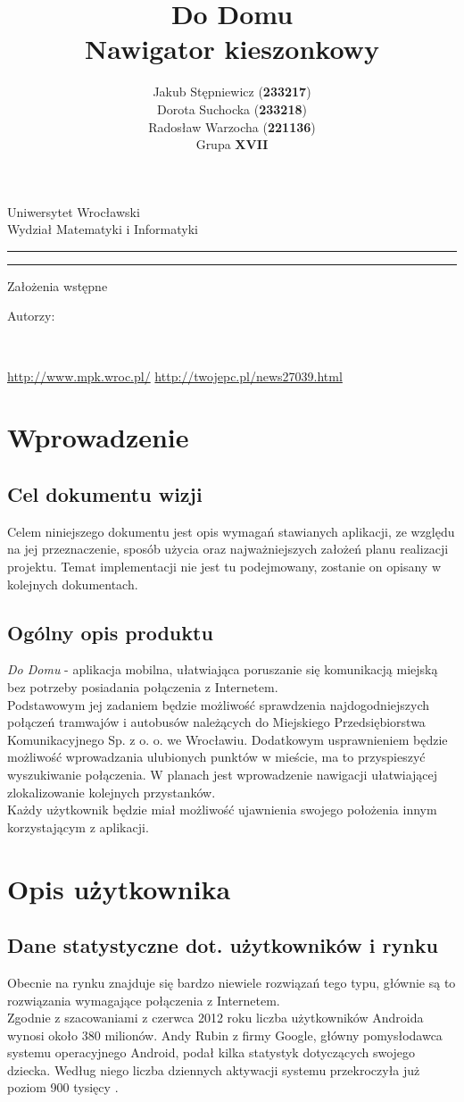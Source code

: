 \documentclass[12pt,a4paper]{article}
\author{Jakub Stępniewicz (\textbf{233217})\\Dorota Suchocka (\textbf{233218})\\Radosław Warzocha (\textbf{221136})
\\Grupa {\bf XVII}}
\title{Do Domu\\ \small{Nawigator kieszonkowy}}
\makeatletter
\newcommand{\linia}{\rule{\linewidth}{0.4mm}}
\renewcommand{\maketitle}{\begin{titlepage}
		\vspace*{1cm}
    \begin{center}\small
    	Uniwersytet Wrocławski\\
    	Wydział Matematyki i Informatyki\\
    \end{center}
    \vspace{3cm}
    \noindent
    \linia
    \begin{center}
    	\LARGE{\textsc{\@title}}
         \end{center}
     \linia
    \begin{center}
    	\Large{Założenia wstępne}
         \end{center}
    \vspace{0.5cm}

    \begin{flushright}

    \begin{minipage}{5.5cm}

    	\small Autorzy:

    \normalsize {\@author} \par
    

    \end{minipage}
    \vspace{5cm}

     

     \end{flushright}

    \vspace*{\stretch{6}}

    \begin{center}

    \@date\\

    \end{center}

  \end{titlepage}%

}
\makeatother
\begin{document}
\maketitle
\tableofcontents
\vspace{5cm}
	\begin{thebibliography}{9}
	 \url{http://www.mpk.wroc.pl/}
	 \url{http://twojepc.pl/news27039.html}
	\end{thebibliography}
\newpage
% 
\section{Wprowadzenie}
	\subsection{Cel dokumentu wizji}
	Celem niniejszego dokumentu jest opis wymagań stawianych aplikacji, ze względu na jej przeznaczenie, sposób użycia oraz najważniejszych założeń planu realizacji projektu. Temat implementacji nie jest tu podejmowany, zostanie on opisany w kolejnych dokumentach.
	
	\subsection{Ogólny opis produktu} 
	\textit{Do Domu} - aplikacja mobilna, ułatwiająca poruszanie się komunikacją miejską bez potrzeby posiadania połączenia z Internetem. \\ 

Podstawowym jej zadaniem będzie możliwość sprawdzenia najdogodniejszych połączeń tramwajów i autobusów należących do Miejskiego Przedsiębiorstwa Komunikacyjnego Sp. z o. o. we Wrocławiu. Dodatkowym usprawnieniem będzie możliwość wprowadzania ulubionych punktów w mieście, ma to przyspieszyć wyszukiwanie połączenia. W planach jest wprowadzenie nawigacji ułatwiającej zlokalizowanie kolejnych przystanków. \\ 

Każdy użytkownik będzie miał możliwość ujawnienia swojego położenia innym korzystającym z aplikacji.
	\newpage
	
\section{Opis użytkownika}

	\subsection{Dane statystyczne dot. użytkowników i rynku}
	Obecnie na rynku znajduje się bardzo niewiele rozwiązań tego typu, głównie są to rozwiązania wymagające połączenia z Internetem. \\
Zgodnie z szacowaniami z czerwca 2012 roku liczba użytkowników Androida wynosi około 380 milionów. Andy Rubin z firmy Google, główny pomysłodawca systemu operacyjnego Android, podał kilka statystyk dotyczących swojego dziecka. Według niego liczba dziennych aktywacji systemu przekroczyła już poziom 900 tysięcy \cite{statystyki}.	
	
\end{document}
